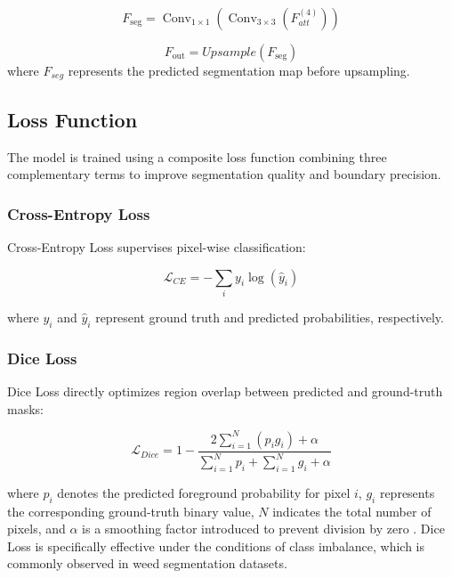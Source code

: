 \documentclass[pdflatex,sn-mathphys-num]{sn-jnl}
\begin{document}
\begin{equation}
F_{\text{seg}} =
\operatorname{Conv}_{1\times1}
\left(
\operatorname{Conv}_{3\times3}
\left(F_{att}^{(4)}\right)
\right)
\label{eq10}
\end{equation}

\begin{equation}
F_{\text{out}} = Upsample(F_{\text{seg}})\label{eq11}
\end{equation}
where $F_{seg}$ represents the predicted segmentation map before upsampling.
\subsection{Loss Function}

The model is trained using a composite loss function combining three complementary terms to improve segmentation quality and boundary precision.

\subsubsection{Cross-Entropy Loss}

Cross-Entropy Loss supervises pixel-wise classification:

\begin{equation}
\mathcal{L}_{CE} = - \sum_{i} y_i \log(\hat{y}_i)
\label{eq:ce_loss}
\end{equation}

where $y_i$ and $\hat{y}_i$ represent ground truth and predicted probabilities, respectively.

\subsubsection{Dice Loss}

Dice Loss directly optimizes region overlap between predicted and ground-truth masks:

\begin{equation}
\mathcal{L}_{Dice} = 1 - \frac{2 \sum_{i=1}^{N} (p_i g_i) + \alpha}
{\sum_{i=1}^{N} p_i + \sum_{i=1}^{N} g_i + \alpha}
\label{eq:dice_loss}
\end{equation}

where $p_i$ denotes the predicted foreground probability for pixel $i$, $g_i$ represents the corresponding ground-truth binary value, $N$ indicates the total number of pixels, and $\alpha$ is a smoothing factor introduced to prevent division by zero \cite{milletari2016vnet}.
Dice Loss is specifically effective under the conditions of class imbalance, which is commonly observed in weed segmentation datasets.
\end{document}
